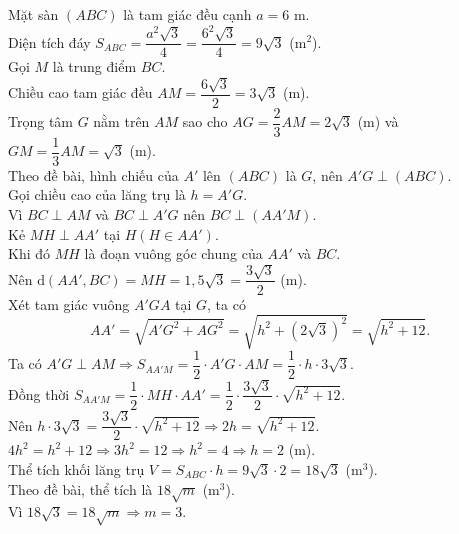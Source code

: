 \begin{ex}
{\begin{center}
		\end{center}
		Mặt sàn $(ABC)$ là tam giác đều cạnh $a=6$ m.\\
		Diện tích đáy $S_{ABC} = \dfrac{a^2\sqrt{3}}{4} = \dfrac{6^2\sqrt{3}}{4} = 9\sqrt{3}$ (m$^2$).\\
		Gọi $M$ là trung điểm $BC$.\\
		Chiều cao tam giác đều $AM = \dfrac{6\sqrt{3}}{2} = 3\sqrt{3}$ (m).\\
		Trọng tâm $G$ nằm trên $AM$ sao cho $AG = \dfrac{2}{3}AM = 2\sqrt{3}$ (m) và $GM = \dfrac{1}{3}AM = \sqrt{3}$ (m).\\
		Theo đề bài, hình chiếu của $A'$ lên $(ABC)$ là $G$, nên $A'G \perp (ABC)$.\\
		Gọi chiều cao của lăng trụ là $h = A'G$.\\
		Vì $BC \perp AM$ và $BC \perp A'G$ nên $BC \perp (AA'M)$.\\
		Kẻ $MH \perp AA'$ tại $H (H \in AA')$.\\
		Khi đó $MH$ là đoạn vuông góc chung của $AA'$ và $BC$.\\
		Nên $\mathrm{d}(AA',BC) = MH = 1{,}5\sqrt{3} = \dfrac{3\sqrt{3}}{2}$ (m).\\
		Xét tam giác vuông $A'GA$ tại $G$, ta có
		$$AA' = \sqrt{A'G^2+AG^2} = \sqrt{h^2+(2\sqrt{3})^2} = \sqrt{h^2+12}.$$
		Ta có $A'G \perp AM \Rightarrow S_{AA'M} = \dfrac{1}{2} \cdot A'G \cdot AM = \dfrac{1}{2} \cdot h \cdot 3\sqrt{3}$.\\
		Đồng thời $S_{AA'M} = \dfrac{1}{2} \cdot MH \cdot AA' = \dfrac{1}{2} \cdot \dfrac{3\sqrt{3}}{2} \cdot \sqrt{h^2+12}$.\\
		Nên $h \cdot 3\sqrt{3} = \dfrac{3\sqrt{3}}{2} \cdot \sqrt{h^2+12} \Rightarrow 2h = \sqrt{h^2+12}$.\\
		$4h^2 = h^2+12 \Rightarrow 3h^2 = 12 \Rightarrow h^2 = 4 \Rightarrow h = 2$ (m).\\
		Thể tích khối lăng trụ $V = S_{ABC} \cdot h = 9\sqrt{3} \cdot 2 = 18\sqrt{3}$ (m$^3$).\\
		Theo đề bài, thể tích là $18\sqrt{m}$ (m$^3$).\\
		Vì $18\sqrt{3} = 18\sqrt{m} \Rightarrow m=3$.
	}
\end{ex}

